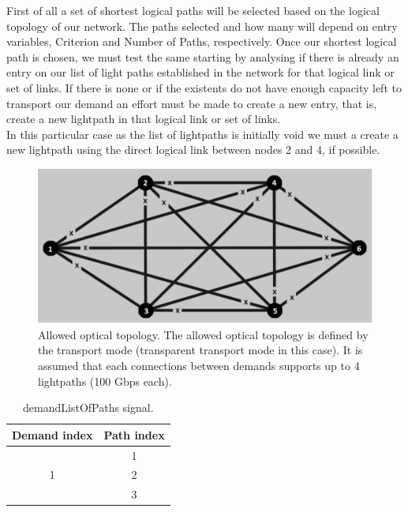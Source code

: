 First of all a set of shortest logical paths will be selected based on the logical topology of our network. The paths selected and how many will depend on entry variables, Criterion and Number of Paths, respectively.
Once our shortest logical path is chosen, we must test the same starting by analysing if there is already an entry on our list of light paths established in the network for that logical link or set of links. If there is none or if the existents do not have enough capacity left to transport our demand an effort must be made to create a new entry, that is, create a new lightpath in that logical link or set of links. \\
In this particular case as the list of lightpaths is initially void we must a create a new lightpath using the direct logical link between nodes 2 and 4, if possible.

\begin{figure}[H]
	\centering
	\includegraphics[width=13cm]{sdf/heuristic/transparent/figures/allowed_optical}
	\caption{Allowed optical topology. The allowed optical topology is defined by the transport mode (transparent transport mode in this case). It is assumed that each connections between demands supports up to 4 lightpaths (100 Gbps each).}
	\label{allowed_optical_surv_ref_high_heuristic_transparent}
\end{figure}

\begin{table}[H]
	\centering
	\begin{tabular}{|c|c|l|l|}
		\hline
		Demand index           & \multicolumn{3}{c|}{Path index} \\ \hline
		\multirow{3}{*}{1} & \multicolumn{3}{c|}{1}          \\ \cline{2-4}
		& \multicolumn{3}{c|}{2}        \\ \cline{2-4}
		& \multicolumn{3}{c|}{3}        \\ \hline
	\end{tabular}
	\caption{demandListOfPaths signal.}
	\label{demandListOfPaths_example}
\end{table}

